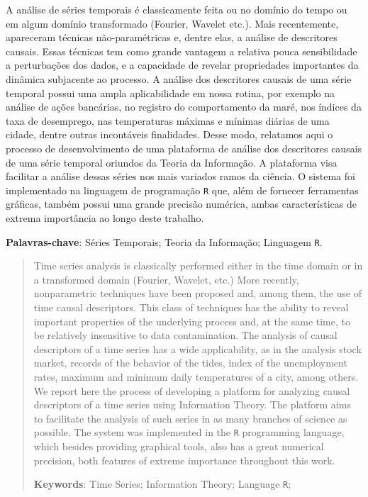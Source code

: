 \documentclass[tcc]{ic}
\begin{document}

\capa

\begin{resumo}

A análise de séries temporais é classicamente feita ou no domínio do tempo ou em algum domínio transformado (Fourier, Wavelet etc.).
Mais recentemente, apareceram técnicas não-paramétricas e, dentre elas, a análise de descritores causais.
Essas técnicas tem como grande vantagem a relativa pouca sensibilidade a perturbações dos dados, e a capacidade de revelar propriedades importantes da dinâmica subjacente ao processo.
A análise dos descritores causais de uma série temporal possui uma ampla aplicabilidade em nossa rotina, por exemplo na análise de ações bancárias, no registro do comportamento da maré, nos índices da taxa de desemprego, nas temperaturas máximas e mínimas diárias de uma cidade, dentre outras incontáveis finalidades. 
Desse modo, relatamos aqui o processo de desenvolvimento de uma plataforma de análise dos descritores causais de uma série temporal oriundos da Teoria da Informação.
A plataforma visa facilitar a análise dessas séries nos mais variados ramos da ciência. 
O sistema foi implementado na linguagem de programação \texttt R que, além de fornecer ferramentas gráficas, também possui uma grande precisão numérica, ambas características de extrema importância ao longo deste trabalho.

\vspace{2em}
\textbf{Palavras-chave}: Séries Temporais; Teoria da Informação; Linguagem \texttt R.

\end{resumo}

\begin{abstract}

Time series analysis is classically performed either in the time domain or in a transformed domain (Fourier, Wavelet, etc.)
More recently, nonparametric techniques have been proposed and, among them, the use of time causal descriptors.
This class of techniques has the ability to reveal important properties of the underlying process and, at the same time, to be relatively insensitive to data contamination.
The analysis of causal descriptors of a time series has a wide applicability, as in the analysis stock market, records of the behavior of the tides, index of the unemployment rates, maximum and minimum daily temperatures of a city, among others.
We report here the process of developing a platform for analyzing causal descriptors of a time series using Information Theory.
The platform aims to facilitate the analysis of such series in as many branches of science as possible.
The system was implemented in the \texttt R programming language, which besides providing graphical tools, also has a great numerical precision, both features of extreme importance throughout this work.

\vspace{2em}
\textbf{Keywords}: Time Series; Information Theory; Language \texttt R;

\end{abstract}
\end{document}
